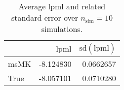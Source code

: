 \begin{table}[H]

\caption{Average lpml and related standard error over $n_{\text{sim}} = 10$ simulations.}
\centering
\begin{tabular}[t]{lrr}
\toprule
  & $\overbar{\text{lpml}}$ & $\text{sd}(\overbar{\text{lpml}})$\\
\midrule
msMK & -8.124830 & 0.0662657\\
True & -8.057101 & 0.0710280\\
\bottomrule
\end{tabular}
\end{table}